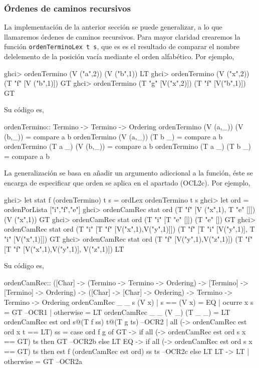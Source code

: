 \subsubsection{Órdenes de caminos recursivos}

La implementación de la anterior sección se puede generalizar, a lo
que llamaremos órdenes de caminos recursivos. Para mayor claridad
crearemos la función \texttt{ordenTerminoLex t s}, que es es el
resultado de comparar el nombre delelemento de la posición vacía
mediante el orden alfabético. Por ejemplo,

\begin{sesion}
ghci> ordenTermino (V ("a",2)) (V ("b",1))
LT
ghci> ordenTermino (V ("x",2)) (T "f" [V ("b",1)])
GT
ghci> ordenTermino (T "g" [V("x",2)]) (T "f" [V("b",1)])
GT
\end{sesion}

Su código es,

\begin{codigo}
ordenTermino::  Termino -> Termino -> Ordering
ordenTermino (V (a,_)) (V (b,_)) = compare a b
ordenTermino (V (a,_)) (T b _) = compare a b
ordenTermino (T a _) (V (b,_)) = compare a b
ordenTermino (T a _) (T b _) = compare a b
\end{codigo}

La generalización se basa en añadir un argumento adiccional a la
función, éste se encarga de especificar que orden se aplica en el
apartado (OCL2c). Por ejemplo,

\begin{sesion}
ghci> let stat f (ordenTermino) t s = ordLex ordenTermino t s 
ghci> let ord = ordenPorLista ["i","f","e"]
ghci> ordenCamRec stat ord (T "f" [V ("x",1), T "e" []]) (V ("x",1))
GT
ghci> ordenCamRec stat ord (T "i" [T "e" []]) (T "e" [])
GT
ghci> ordenCamRec stat ord (T "i" [T "f" [V("x",1),V("y",1)]])
                           (T "f" [T "i" [V("y",1)], T "i" [V("x",1)]])
GT
ghci> ordenCamRec stat ord (T "f" [V("y",1),V("z",1)])
                           (T "f" [T "f" [V("x",1),V("y",1)], V("z",1)])
LT
\end{sesion}

Su código es,

\begin{codigo}
ordenCamRec:: ([Char] -> (Termino -> Termino -> Ordering)
                      -> [Termino] -> [Termino] -> Ordering)
           ->  ([Char] -> [Char] -> Ordering)
           -> Termino
           -> Termino
           -> Ordering
ordenCamRec _ _ s (V x)
  | s == (V x) = EQ
  | ocurre x s = GT --OCR1
  | otherwise = LT
ordenCamRec _ _ (V _) (T _ _) = LT
ordenCamRec est ord s@(T f ss) t@(T g ts) --OCR2
  | all (\x -> ordenCamRec est ord x t == LT) ss
    = case ord f g of
      GT -> if all (\x -> ordenCamRec est ord s x == GT) ts
            then GT --OCR2b
            else LT
      EQ -> if all (\x -> ordenCamRec est ord s x == GT) ts
            then est f (ordenCamRec est ord) ss ts --OCR2c
            else LT
      LT -> LT
  | otherwise = GT --OCR2a
\end{codigo}




\clearpage
\addappheadtotoc
\appendix


